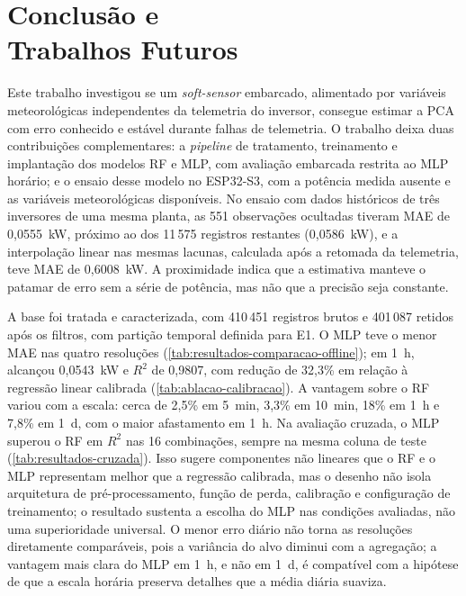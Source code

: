 \chapter[Conclusão e Trabalhos Futuros]{Conclusão e\\ Trabalhos Futuros}
\label{cap:conclusao}

Este trabalho investigou se um \textit{soft-sensor} embarcado, alimentado por
variáveis meteorológicas independentes da telemetria do inversor, consegue
estimar a PCA com erro conhecido e estável durante falhas de telemetria. O trabalho deixa
duas contribuições complementares: a \textit{pipeline} de tratamento, treinamento
e implantação dos modelos RF e MLP, com avaliação embarcada restrita ao MLP
horário; e o ensaio desse modelo no ESP32-S3, com a potência medida ausente e as
variáveis meteorológicas disponíveis. No ensaio com dados históricos de três
inversores de uma mesma planta, as 551 observações ocultadas tiveram MAE de
0,0555~kW, próximo ao dos 11\,575 registros restantes (0,0586~kW), e a
interpolação linear nas mesmas lacunas, calculada após a retomada da telemetria,
teve MAE de 0,6008~kW. A proximidade indica que a estimativa manteve o patamar de
erro sem a série de potência, mas não que a precisão seja constante.

A base foi tratada e caracterizada, com 410\,451 registros brutos e 401\,087
retidos após os filtros, com partição temporal definida para E1. O MLP teve o
menor MAE nas quatro resoluções (\cref{tab:resultados-comparacao-offline}); em
1~h, alcançou 0,0543~kW e $R^2$ de 0,9807, com redução de 32,3\% em relação à
regressão linear calibrada (\cref{tab:ablacao-calibracao}). A vantagem sobre o RF
variou com a escala: cerca de 2,5\% em 5~min, 3,3\% em 10~min, 18\% em 1~h e
7,8\% em 1~d, com o maior afastamento em 1~h. Na avaliação cruzada, o MLP superou
o RF em $R^2$ nas 16 combinações, sempre na mesma coluna de teste
(\cref{tab:resultados-cruzada}). Isso sugere
componentes não lineares que o RF e o MLP representam melhor que a regressão
calibrada, mas o desenho não isola arquitetura de pré-processamento, função de
perda, calibração e configuração de treinamento; o resultado sustenta a escolha
do MLP nas condições avaliadas, não uma superioridade universal. O menor erro
diário não torna as resoluções diretamente comparáveis, pois a variância do alvo
diminui com a agregação; a vantagem mais clara do MLP em 1~h, e não em 1~d, é
compatível com a hipótese de que a escala horária preserva detalhes que a média
diária suaviza.

